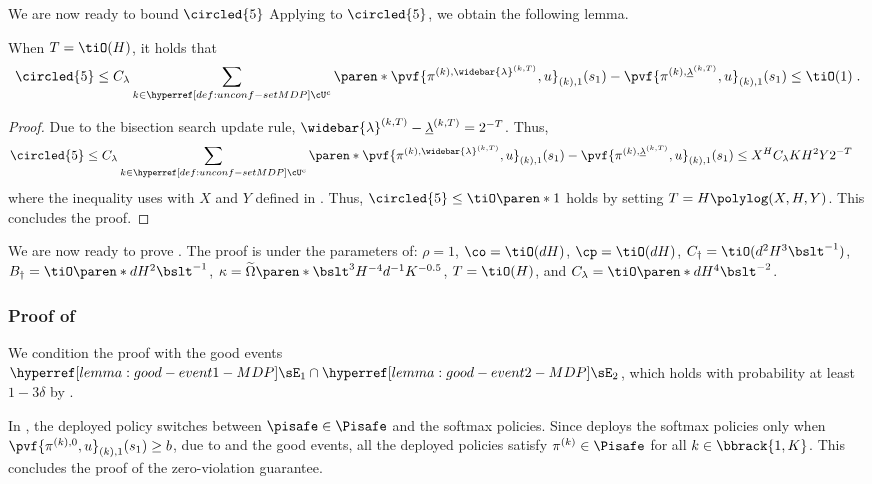 We are now ready to bound $\circled{5}$
Applying  to $\circled{5}$, we obtain the following lemma.
\begin{lemma}\label{lemma:binary-search-bound}
When $T = \tiO(H)$, it holds that 
$$\circled{5} \leq 
C_\lambda \sum_{k \in \unconfMDP^c} 
\paren*{
\pvf{\pi^{(k), \widebar{\lambda}^{(k, T)}}, u}_{(k), 1}(s_1) - 
\pvf{\pi^{(k), \underline{\lambda}^{(k, T)}}, u}_{(k), 1}(s_1)
}
\leq \tiO(1)\;.$$
\end{lemma}
\begin{proof}
Due to the bisection search update rule, $\widebar{\lambda}^{(k, T)} - \underline{\lambda}^{(k, T)} = 2^{-T}$.
Thus, 
\begin{align*}
\circled{5} 
&\leq 
C_\lambda \sum_{k \in \unconfMDP^c} 
\paren*{
\pvf{\pi^{(k), \widebar{\lambda}^{(k, T)}}, u}_{(k), 1}(s_1) - 
\pvf{\pi^{(k), \underline{\lambda}^{(k, T)}}, u}_{(k), 1}(s_1)
}
\leq
X^H C_\lambda K H^2 Y 2^{-T}
\end{align*}    
where the inequality uses  with $X$ and $Y$ defined in .
Thus, $\circled{5}\leq \tiO\paren*{1}$ holds by setting $T = H \polylog(X, H, Y)$. 
This concludes the proof.
\end{proof}

We are now ready to prove .
The proof is under the parameters of: 
$\rho = 1$,
$\co=\tiO(dH)$, 
$\cp=\tiO(dH)$,
$C_\dagger=\tiO(d^2H^3\bslt^{-1})$,
$B_\dagger = \tiO\paren*{dH^2\bslt^{-1}}$,
$\kappa = \widetilde{\Omega}\paren*{\bslt^3 H^{-4}d^{-1}K^{-0.5}}$, 
$T=\tiO(H)$, and
$C_\lambda = \tiO\paren*{dH^4\bslt^{-2}}$.

\subsubsection{Proof of }

We condition the proof with the good events $\rmvEevent \cap \confevent$, which holds with probability at least $1-3\delta$ by .

In , the deployed policy switches between $\pisafe \in \Pisafe$ and the softmax policies.
Since  deploys the softmax policies only when $\pvf{\pi^{(k), 0}, u}_{(k), 1}(s_1) \geq b$, due to  and the good events, all the deployed policies satisfy $\pi^{(k)} \in \Pisafe$ for all $k \in \bbrack{1, K}$.
This concludes the proof of the zero-violation guarantee.

